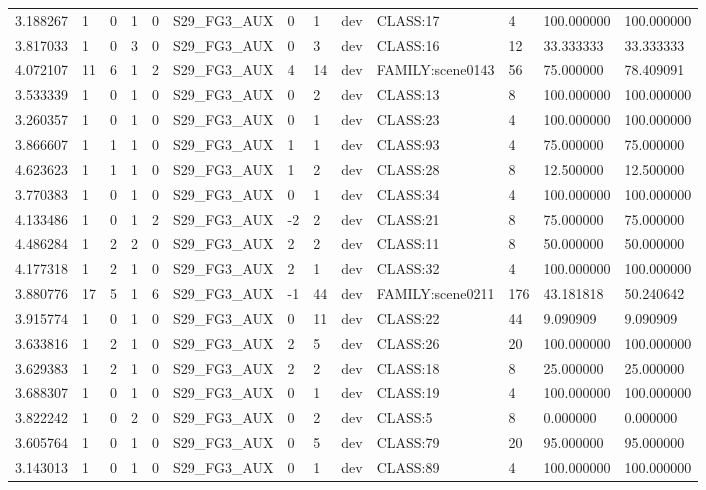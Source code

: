 \begin{tabular}{lllllllllllll}
3.188267 & 1 & 0 & 1 & 0 & S29\_FG3\_AUX & 0 & 1 & dev & CLASS:17 & 4 & 100.000000 & 100.000000 \\
3.817033 & 1 & 0 & 3 & 0 & S29\_FG3\_AUX & 0 & 3 & dev & CLASS:16 & 12 & 33.333333 & 33.333333 \\
4.072107 & 11 & 6 & 1 & 2 & S29\_FG3\_AUX & 4 & 14 & dev & FAMILY:scene0143 & 56 & 75.000000 & 78.409091 \\
3.533339 & 1 & 0 & 1 & 0 & S29\_FG3\_AUX & 0 & 2 & dev & CLASS:13 & 8 & 100.000000 & 100.000000 \\
3.260357 & 1 & 0 & 1 & 0 & S29\_FG3\_AUX & 0 & 1 & dev & CLASS:23 & 4 & 100.000000 & 100.000000 \\
3.866607 & 1 & 1 & 1 & 0 & S29\_FG3\_AUX & 1 & 1 & dev & CLASS:93 & 4 & 75.000000 & 75.000000 \\
4.623623 & 1 & 1 & 1 & 0 & S29\_FG3\_AUX & 1 & 2 & dev & CLASS:28 & 8 & 12.500000 & 12.500000 \\
3.770383 & 1 & 0 & 1 & 0 & S29\_FG3\_AUX & 0 & 1 & dev & CLASS:34 & 4 & 100.000000 & 100.000000 \\
4.133486 & 1 & 0 & 1 & 2 & S29\_FG3\_AUX & -2 & 2 & dev & CLASS:21 & 8 & 75.000000 & 75.000000 \\
4.486284 & 1 & 2 & 2 & 0 & S29\_FG3\_AUX & 2 & 2 & dev & CLASS:11 & 8 & 50.000000 & 50.000000 \\
4.177318 & 1 & 2 & 1 & 0 & S29\_FG3\_AUX & 2 & 1 & dev & CLASS:32 & 4 & 100.000000 & 100.000000 \\
3.880776 & 17 & 5 & 1 & 6 & S29\_FG3\_AUX & -1 & 44 & dev & FAMILY:scene0211 & 176 & 43.181818 & 50.240642 \\
3.915774 & 1 & 0 & 1 & 0 & S29\_FG3\_AUX & 0 & 11 & dev & CLASS:22 & 44 & 9.090909 & 9.090909 \\
3.633816 & 1 & 2 & 1 & 0 & S29\_FG3\_AUX & 2 & 5 & dev & CLASS:26 & 20 & 100.000000 & 100.000000 \\
3.629383 & 1 & 2 & 1 & 0 & S29\_FG3\_AUX & 2 & 2 & dev & CLASS:18 & 8 & 25.000000 & 25.000000 \\
3.688307 & 1 & 0 & 1 & 0 & S29\_FG3\_AUX & 0 & 1 & dev & CLASS:19 & 4 & 100.000000 & 100.000000 \\
3.822242 & 1 & 0 & 2 & 0 & S29\_FG3\_AUX & 0 & 2 & dev & CLASS:5 & 8 & 0.000000 & 0.000000 \\
3.605764 & 1 & 0 & 1 & 0 & S29\_FG3\_AUX & 0 & 5 & dev & CLASS:79 & 20 & 95.000000 & 95.000000 \\
3.143013 & 1 & 0 & 1 & 0 & S29\_FG3\_AUX & 0 & 1 & dev & CLASS:89 & 4 & 100.000000 & 100.000000 \\

\end{tabular}
